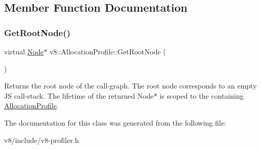 \subsection{Member Function Documentation}
\mbox{\label{classv8_1_1AllocationProfile_afea045dae30df5477088e2f0b7edb6c4}} 
\subsubsection{\texorpdfstring{Get\+Root\+Node()}{GetRootNode()}}
{\footnotesize\ttfamily virtual \mbox{\hyperlink{structv8_1_1AllocationProfile_1_1Node}{Node}}$\ast$ v8\+::\+Allocation\+Profile\+::\+Get\+Root\+Node (\begin{DoxyParamCaption}{ }\end{DoxyParamCaption})\hspace{0.3cm}{\ttfamily [pure virtual]}}

Returns the root node of the call-\/graph. The root node corresponds to an empty JS call-\/stack. The lifetime of the returned Node$\ast$ is scoped to the containing \mbox{\hyperlink{classv8_1_1AllocationProfile}{Allocation\+Profile}}. 

The documentation for this class was generated from the following file\+:\begin{DoxyCompactItemize}
\item 
v8/include/v8-\/profiler.\+h\end{DoxyCompactItemize}
